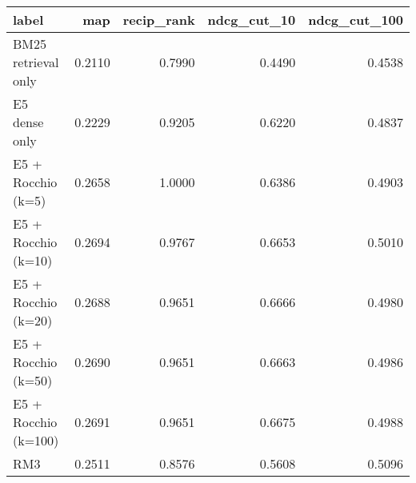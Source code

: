\begin{tabular}{lrrrr}
\toprule
label & map & recip_rank & ndcg_cut_10 & ndcg_cut_100 \\
\midrule
BM25 retrieval only & 0.2110 & 0.7990 & 0.4490 & 0.4538 \\
E5 dense only & 0.2229 & 0.9205 & 0.6220 & 0.4837 \\
E5 + Rocchio (k=5) & 0.2658 & 1.0000 & 0.6386 & 0.4903 \\
E5 + Rocchio (k=10) & 0.2694 & 0.9767 & 0.6653 & 0.5010 \\
E5 + Rocchio (k=20) & 0.2688 & 0.9651 & 0.6666 & 0.4980 \\
E5 + Rocchio (k=50) & 0.2690 & 0.9651 & 0.6663 & 0.4986 \\
E5 + Rocchio (k=100) & 0.2691 & 0.9651 & 0.6675 & 0.4988 \\
RM3 & 0.2511 & 0.8576 & 0.5608 & 0.5096 \\
\bottomrule
\end{tabular}
